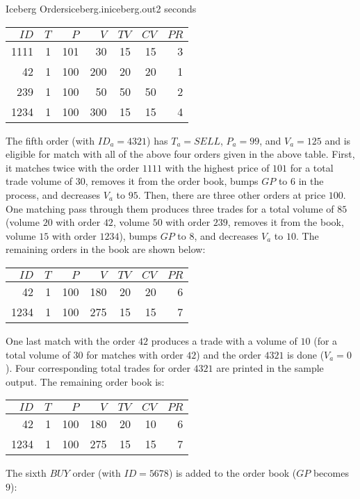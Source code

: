 \begin{problem}{Iceberg Orders}{iceberg.in}{iceberg.out}{2 seconds}
\begin{tabular}{| r r r r r r | r |} 
\hline
$ID$ & $T$ & $P$ & $V$ & $TV$ & $CV$ & $PR$ \\ \hline
1111 & 1 & 101 &  30 & 15 & 15 & 3 \\ \hline
  42 & 1 & 100 & 200 & 20 & 20 & 1 \\
 239 & 1 & 100 &  50 & 50 & 50 & 2 \\
1234 & 1 & 100 & 300 & 15 & 15 & 4 \\ 
\hline
\end{tabular}

The fifth order (with $ID_a=4321$) has $T_a = SELL$, $P_a = 99$, and $V_a=125$ and is eligible for match with all of the above four
orders given in the above table. First, it matches twice with the order $1111$ with the highest price of $101$ 
for a total trade volume of $30$, removes it from the order book, bumps $GP$ to $6$ in the process, and decreases $V_a$ to $95$.
Then, there are three other orders at price $100$. One matching pass through them produces three trades for a total volume of $85$
(volume $20$ with order $42$, volume $50$ with order $239$, removes it from the book, volume $15$ with order $1234$), bumps 
$GP$ to $8$, and decreases $V_a$ to $10$. The remaining orders in the book are shown below:

\begin{tabular}{| r r r r r r | r |} 
\hline
$ID$ & $T$ & $P$ & $V$ & $TV$ & $CV$ & $PR$ \\ \hline
  42 & 1 & 100 & 180 & 20 & 20 & 6 \\
1234 & 1 & 100 & 275 & 15 & 15 & 7 \\
\hline
\end{tabular}

One last match with the order $42$ produces a trade with a volume of $10$ (for a total volume of $30$ for matches with order $42$)
and the order $4321$ is done ($V_a=0$). Four corresponding total trades for order $4321$ are printed in the
sample output. The remaining order book is:

\begin{tabular}{| r r r r r r | r |} 
\hline
$ID$ & $T$ & $P$ & $V$ & $TV$ & $CV$ & $PR$ \\ \hline
  42 & 1 & 100 & 180 & 20 & 10 & 6 \\
1234 & 1 & 100 & 275 & 15 & 15 & 7 \\
\hline
\end{tabular}

The sixth $BUY$ order (with $ID=5678$) is added to the order book ($GP$ becomes $9$):


\end{problem}
